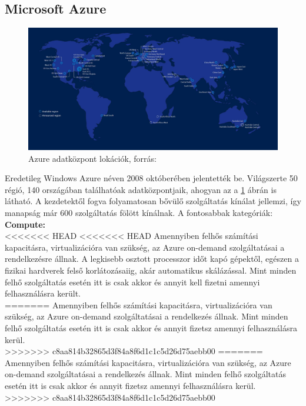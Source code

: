 \documentclass[12pt,oneside,justify,table]{book}
\begin{document}
\subsection{Microsoft Azure}
\begin{figure}[H]
\centering
\includegraphics[width=1\textwidth]{azure_locations.jpg}
\caption{Azure adatközpont lokációk, forrás: \cite{Azure_Regions}}
\label{fig:AzureRegions}
\end{figure}
Eredetileg Windows Azure néven 2008 októberében jelentették be. Világszerte 50 régió, 140 országában találhatóak adatközpontjaik, ahogyan az a \ref{fig:AzureRegions} ábrán is látható. A kezdetektől fogva folyamatosan bővülő szolgáltatás kínálat jellemzi, így manapság már 600 szolgáltatás fölött kínálnak. A fontosabbak kategóriák: \cite{Azure_Services}\\

\noindent \textbf{Compute:}\\
<<<<<<< HEAD
<<<<<<< HEAD
Amennyiben felhős számítási kapacitásra, virtualizációra van szükség, az Azure on-demand szolgáltatásai a rendelkezésre állnak. A legkisebb osztott processzor időt kapó gépektől, egészen a fizikai hardverek felső korlátozásaiig, akár automatikus skálázással. Mint minden felhő szolgáltatás esetén itt is csak akkor és annyit kell fizetni amennyi felhasználásra került. \\
=======
Amennyiben felhős számítási kapacitásra, virtualizációra van szükség, az Azure on-demand szolgáltatásai a rendelkezés állnak. Mint minden felhő szolgáltatás esetén itt is csak akkor és annyit fizetsz amennyi felhasználásra kerül. \\
>>>>>>> c8aa814b32865d3f84a8f6d1c1c5d26d75aebb00
=======
Amennyiben felhős számítási kapacitásra, virtualizációra van szükség, az Azure on-demand szolgáltatásai a rendelkezés állnak. Mint minden felhő szolgáltatás esetén itt is csak akkor és annyit fizetsz amennyi felhasználásra kerül. \\
>>>>>>> c8aa814b32865d3f84a8f6d1c1c5d26d75aebb00
\end{document}
